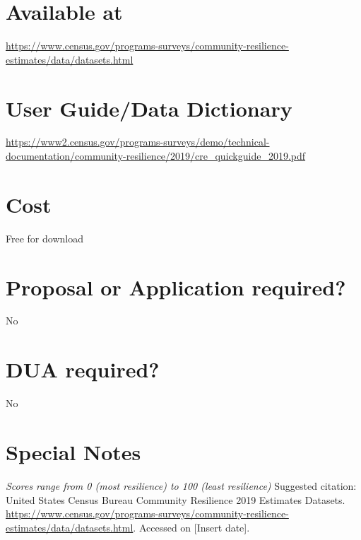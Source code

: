 \documentclass[
]{book}
\begin{document}
\hypertarget{available-at-17}{%
\section{Available at}\label{available-at-17}}

\url{https://www.census.gov/programs-surveys/community-resilience-estimates/data/datasets.html}

\hypertarget{user-guidedata-dictionary-17}{%
\section{User Guide/Data Dictionary}\label{user-guidedata-dictionary-17}}

\url{https://www2.census.gov/programs-surveys/demo/technical-documentation/community-resilience/2019/cre_quickguide_2019.pdf}

\hypertarget{cost-17}{%
\section{Cost}\label{cost-17}}

Free for download

\hypertarget{proposal-or-application-required-17}{%
\section{Proposal or Application required?}\label{proposal-or-application-required-17}}

No

\hypertarget{dua-required-17}{%
\section{DUA required?}\label{dua-required-17}}

No

\hypertarget{special-notes-17}{%
\section{Special Notes}\label{special-notes-17}}

\emph{Scores range from 0 (most resilience) to 100 (least resilience)
} Suggested citation: United States Census Bureau Community Resilience 2019 Estimates Datasets. \url{https://www.census.gov/programs-surveys/community-resilience-estimates/data/datasets.html}. Accessed on {[}Insert date{]}.

\mainmatter
\end{document}
